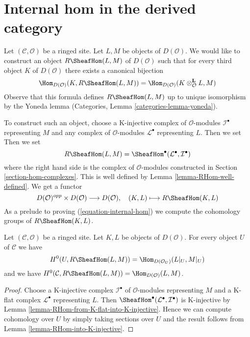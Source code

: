 \section{Internal hom in the derived category}
\label{section-internal-hom}

\noindent
Let $(\mathcal{C}, \mathcal{O})$ be a ringed site. Let $L, M$ be objects
of $D(\mathcal{O})$. We would like to construct an object
$R\SheafHom(L, M)$ of $D(\mathcal{O})$ such that for every third
object $K$ of $D(\mathcal{O})$ there exists a canonical bijection
\begin{equation}
\label{equation-internal-hom}
\Hom_{D(\mathcal{O})}(K, R\SheafHom(L, M))
=
\Hom_{D(\mathcal{O})}(K \otimes_\mathcal{O}^\mathbf{L} L, M)
\end{equation}
Observe that this formula defines $R\SheafHom(L, M)$ up to unique
isomorphism by the Yoneda lemma
(Categories, Lemma \ref{categories-lemma-yoneda}).

\medskip\noindent
To construct such an object, choose a K-injective complex of
$\mathcal{O}$-modules $\mathcal{I}^\bullet$ representing $M$ and any
complex of $\mathcal{O}$-modules $\mathcal{L}^\bullet$ representing $L$.
Then we set
Then we set
$$
R\SheafHom(L, M) = \SheafHom^\bullet(\mathcal{L}^\bullet, \mathcal{I}^\bullet)
$$
where the right hand side is the complex of $\mathcal{O}$-modules
constructed in Section \ref{section-hom-complexes}.
This is well defined by Lemma \ref{lemma-RHom-well-defined}.
We get a functor
$$
D(\mathcal{O})^{opp} \times D(\mathcal{O}) \longrightarrow D(\mathcal{O}),
\quad
(K, L) \longmapsto R\SheafHom(K, L)
$$
As a prelude to proving (\ref{equation-internal-hom})
we compute the cohomology groups of $R\SheafHom(K, L)$.

\begin{lemma}
\label{lemma-section-RHom-over-U}
Let $(\mathcal{C}, \mathcal{O})$ be a ringed site. Let $K, L$ be objects
of $D(\mathcal{O})$. For every object $U$ of $\mathcal{C}$ we have
$$
H^0(U, R\SheafHom(L, M)) =
\Hom_{D(\mathcal{O}_U)}(L|_U, M|_U)
$$
and we have $H^0(\mathcal{C}, R\SheafHom(L, M)) =
\Hom_{D(\mathcal{O})}(L, M)$.
\end{lemma}

\begin{proof}
Choose a K-injective complex $\mathcal{I}^\bullet$ of
$\mathcal{O}$-modules representing $M$ and a K-flat complex
$\mathcal{L}^\bullet$ representing $L$. Then
$\SheafHom^\bullet(\mathcal{L}^\bullet, \mathcal{I}^\bullet)$
is K-injective by Lemma \ref{lemma-RHom-from-K-flat-into-K-injective}.
Hence we can compute cohomology over $U$ by simply taking sections over $U$
and the result follows from Lemma \ref{lemma-RHom-into-K-injective}.
\end{proof}

